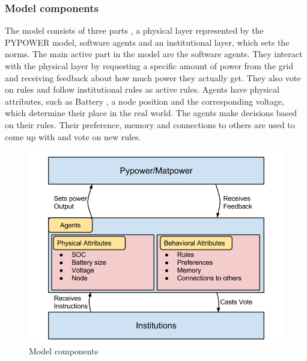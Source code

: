 \documentclass[a4paper]{article}
\begin{document}
\subsubsection{Model components}
The model consists of three parts , a physical layer represented by the PYPOWER model, software agents and an institutional 
layer, which sets the norms. 
The main active part in the model are the software agents. They interact with the physical layer by requesting a 
specific amount of power from the grid and receiving feedback about how much power they actually get. They also vote on rules 
and follow institutional rules as active rules. 
Agents have physical attributes, such as Battery , a node position and the corresponding voltage,  which determine their 
place in the real world. The agents make decisions based on their rules. Their preference, memory and connections to others 
are used to come up with and vote on new rules.
\begin{figure}[!ht]
\includegraphics[width =\textwidth]{concept_components.png}
\caption{Model components}
\label{mcomponents}
\end{figure}
\end{document}
